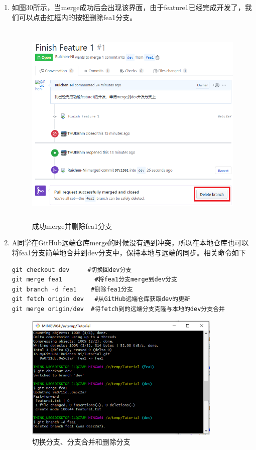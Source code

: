 \documentclass[a4paper,14pt]{article}
\begin{document}
\begin{enumerate}[1. ]
\newpage
\item 如图30所示，当merge成功后会出现该界面，由于feature1已经完成开发了，我们可以点击红框内的按钮删除fea1分支。
\begin{figure}[h]
\centering
\includegraphics[height=10cm]{figure/step12}
\caption{成功merge并删除fea1分支}
\end{figure}
\item A同学在GitHub远端仓库merge的时候没有遇到冲突，所以在本地仓库也可以将fea1分支简单地合并到dev分支中，保持本地与远端的同步。相关命令如下
{\color{red}
\begin{lstlisting}[language=C]
git checkout dev     #切换回dev分支
git merge fea1         #将fea1分支merge到dev分支
git branch -d fea1    #删除fea1分支
git fetch origin dev   #从GitHub远端仓库获取dev的更新
git merge origin/dev  #将fetch到的远端分支克隆与本地的dev分支合并
\end{lstlisting}
}
\begin{figure}[h]
\centering
\includegraphics[height=6cm]{figure/step13}
\caption{切换分支、分支合并和删除分支}
\end{figure}

\end{enumerate}
\end{document}
